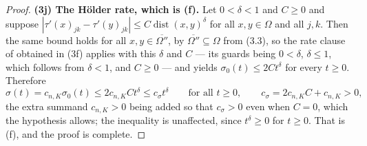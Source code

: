 \begin{proof}
\textbf{(3j) The H\"older rate, which is (f).}  Let $0<\delta<1$ and $C\ge0$ and
suppose $|\tau'(x)_{jk}-\tau'(y)_{jk}|\le C\operatorname{dist}(x,y)^\delta$ for
all $x,y\in\Omega$ and all $j,k$.  Then the same bound holds for all
$x,y\in\overline{\Omega''}$, by $\overline{\Omega''}\subseteq\Omega$ from (3.3),
so the rate clause of  obtained in (3f)
applies with this $\delta$ and $C$ --- its guards being $0<\delta$, $\delta\le1$,
which follows from $\delta<1$, and $C\ge0$ --- and yields
$\sigma_0(t)\le2Ct^\delta$ for every $t\ge0$.  Therefore
\[
\sigma(t)=c_{n,K}\sigma_0(t)\le2c_{n,K}Ct^\delta\le c_\sigma t^\delta
\qquad\text{for all }t\ge0,
\qquad
c_\sigma=2c_{n,K}C+c_{n,K}>0 ,
\]
the extra summand $c_{n,K}>0$ being added so that $c_\sigma>0$ even when $C=0$,
which the hypothesis allows; the inequality is unaffected, since $t^\delta\ge0$
for $t\ge0$.  That is (f), and the proof is complete.
\end{proof}
